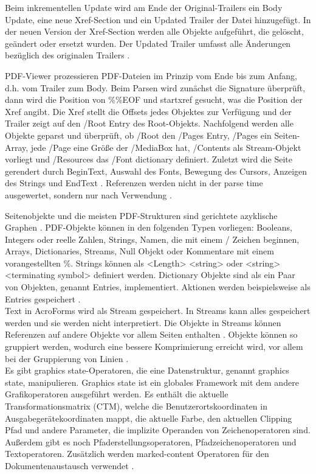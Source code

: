 \par
Beim inkrementellen Update wird am Ende der Original-Trailers ein Body Update, eine neue Xref-Section und ein Updated Trailer der Datei hinzugefügt. In der neuen Version der Xref-Section werden alle Objekte aufgeführt, die gelöscht, geändert oder ersetzt wurden. Der Updated Trailer umfasst alle Änderungen bezüglich des originalen Trailers \cite{schneeberger}.
\par
PDF-Viewer prozessieren PDF-Dateien im Prinzip vom Ende bis zum Anfang, d.h. vom Trailer zum Body\cite{ccc-break-pdf}. Beim Parsen wird zunächst die Signature überprüft, dann wird die Position von \%\%EOF und startxref gesucht, was die Position der Xref angibt. Die Xref stellt die Offsets jedes Objektes zur Verfügung und der Trailer zeigt auf den /Root Entry des Root-Objekts. Nachfolgend werden alle Objekte geparst und überprüft, ob /Root den /Pages Entry, /Pages ein Seiten-Array, jede /Page eine Größe der /MediaBox hat, /Contents als Stream-Objekt vorliegt und /Resources das /Font dictionary definiert. Zuletzt wird die Seite gerendert durch BeginText, Auswahl des Fonts, Bewegung des Cursors, Anzeigen des Strings und EndText \cite{ccc-pdf-secrets}. Referenzen werden nicht in der parse time ausgewertet, sondern nur nach Verwendung \cite{ccc-wtf-pdf}.
\par
Seitenobjekte und die meisten PDF-Strukturen sind gerichtete azyklische Graphen \cite{ccc-wtf-pdf}. PDF-Objekte können in den folgenden Typen vorliegen: Booleans, Integers oder reelle Zahlen, Strings, Namen, die mit einem / Zeichen beginnen, Arrays, Dictionaries, Streams, Null Objekt oder Kommentare mit einem vorangestellten \%. Strings können als <Length> <string> oder <string> <terminating symbol> definiert werden. Dictionary Objekte sind als ein Paar von Objekten, genannt Entries, implementiert. Aktionen werden beispielsweise als Entries gespeichert \cite{ccc-badpdf}. \\
Text in AcroForms wird als Stream gespeichert. In Streams kann alles gespeichert werden und sie werden nicht interpretiert. Die Objekte in Streams können Referenzen auf andere Objekte vor allem Seiten enthalten \cite{ccc-break-pdf}. Objekte können so gruppiert werden, wodurch eine bessere Komprimierung erreicht wird, vor allem bei der Gruppierung von Linien \cite{schneeberger}. \\
Es gibt graphics state-Operatoren, die eine Datenstruktur, genannt graphics state, manipulieren. Graphics state ist ein globales Framework mit dem andere Grafikoperatoren ausgeführt werden. Es enthält die aktuelle Transformationsmatrix (CTM), welche die Benutzerortskoordinaten in Ausgabegerätekoordinaten mappt, die aktuelle Farbe, den aktuellen Clipping Pfad und andere Parameter, die implizite Operanden von Zeichenoperatoren sind. Außerdem gibt es noch Pfaderstellungsoperatoren, Pfadzeichenoperatoren und Textoperatoren. Zusätzlich werden marked-content Operatoren für den Dokumentenaustausch verwendet\cite{fileformat} . 
